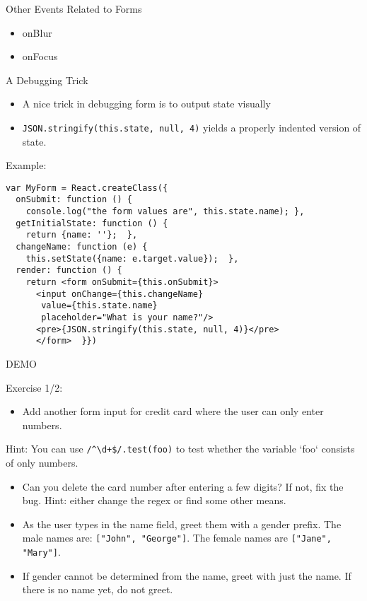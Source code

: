 \documentclass[presentation]{beamer}
\begin{document}
\begin{frame}[label=sec-12]{Other Events Related to Forms}
\begin{itemize}
\item onBlur
\item onFocus
\end{itemize}
\end{frame}

\begin{frame}[fragile,label=sec-13]{A Debugging Trick}
 \begin{itemize}
\item A nice trick in debugging form is to output state visually
\item \texttt{JSON.stringify(this.state, null, 4)} yields a properly indented version of
state.
\end{itemize}
\end{frame}

\begin{frame}[fragile,label=sec-14]{Example:}
 \begin{verbatim}
var MyForm = React.createClass({
  onSubmit: function () {
    console.log("the form values are", this.state.name); },
  getInitialState: function () {
    return {name: ''};  },
  changeName: function (e) {
    this.setState({name: e.target.value});  },
  render: function () {
    return <form onSubmit={this.onSubmit}>
      <input onChange={this.changeName}
       value={this.state.name}
       placeholder="What is your name?"/>
      <pre>{JSON.stringify(this.state, null, 4)}</pre>
      </form>  }})
\end{verbatim}


DEMO
\end{frame}

\begin{frame}[fragile,label=sec-15]{Exercise 1/2:}
 \begin{itemize}
\item Add another form input for credit card where the user can only enter numbers.
\end{itemize}

Hint: You can use \texttt{/\textasciicircum{}\textbackslash{}d+\$/.test(foo)} to test whether the variable `foo` consists of only numbers.

\begin{itemize}
\item Can you delete the card number after entering a few digits? If not, fix the
bug. Hint: either change the regex or find some other means.

\item As the user types in the name field, greet them with a gender prefix. The
male names are: \texttt{["John", "George"]}. The female names are \texttt{["Jane",
  "Mary"]}.

\item If gender cannot be determined from the name, greet with just the name. If
there is no name yet, do not greet.
\end{itemize}
\end{frame}
\end{document}
